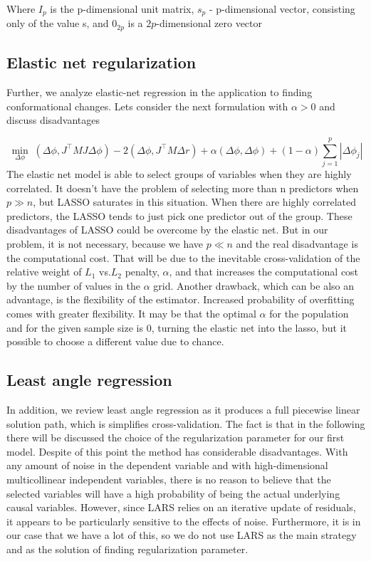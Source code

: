 \documentclass[12pt,twoside]{article}
\begin{document}
Where $I_{p}$ is the p-dimensional unit matrix, $s_{p}$ - p-dimensional vector, consisting only of the value s, and $0_{2p}$ is a $2p$-dimensional zero vector

 \subsection{\small{Elastic net regularization}}
Further, we analyze elastic-net regression in the application to finding conformational changes.  Lets consider the next formulation with  $\alpha > 0$ and discuss disadvantages

$$\min_{\Delta \phi} \; (\Delta \phi, J^{\top}MJ \Delta \phi)-2(\Delta \phi, J^{\top}M\Delta r) + \alpha(\Delta \phi, \Delta \phi) + (1-\alpha)\sum\limits_{j=1}^{p} |\Delta\phi_j|$$
The elastic net model is able to select groups of variables when they are highly correlated. It doesn't have the problem of selecting more than n predictors when $p \gg n$, but LASSO saturates in this situation. When there are highly correlated predictors, the LASSO tends to just pick one predictor out of the group. These disadvantages of LASSO could be overcome by the elastic net. But in our problem, it is not necessary, because we have $p \ll n$ and the real disadvantage is the computational cost. That will be due to the inevitable cross-validation of the relative weight of $L_1$ vs.$L_2$ penalty, $\alpha$, and that increases the computational cost by the number of values in the $\alpha$ grid. Another drawback, which can be also an advantage, is the flexibility of the estimator. Increased probability of overfitting comes with greater flexibility. It may be that the optimal $\alpha$ for the population and for the given sample size is 0, turning the elastic net into the lasso, but it possible to choose a different value due to chance\cite{RePEc:bla:jorssb:v:67:y:2005:i:5:p:768-768}. 


 \subsection{\small{Least angle regression }}
In addition, we review least angle regression as it produces a full piecewise linear solution path, which is simplifies cross-validation. The fact is that in the following there will be discussed the choice of the regularization parameter for our first model. Despite of this point the method has considerable disadvantages. With any amount of noise in the dependent variable and with high-dimensional multicollinear independent variables, there is no reason to believe that the selected variables will have a high probability of being the actual underlying causal variables. However, since LARS relies on an iterative update of residuals, it appears to be particularly sensitive to the effects of noise\cite{efron2004least}.  Furthermore, it is in our case that we have a lot of this, so we do not use LARS as the main strategy and as the solution of finding regularization parameter. 
\end{document}
